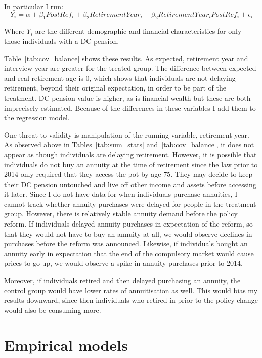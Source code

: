 \documentclass[12pt]{article}
\begin{document}
In particular I run:
\begin{equation*}
  Y_{i} = \alpha + \beta_{1} PostRef_{i} + \beta_{2} RetirementYear_{i}  + \beta_{2} RetirementYear_{i}PostRef_{i}  + \epsilon_{i}
\end{equation*}

Where $Y_{i}$ are the different demographic and financial characteristics for
only those individuals with a DC pension.

\linespread{1}

\linespread{1.5}

Table~\ref{tab:cov_balance} shows these results. As expected, retirement year
and interview year are greater for the treated group. The difference between
expected and real retirement age is 0, which shows that individuals are not
delaying retirement, beyond their original expectation, in order to be part of
the treatment. DC pension value is higher, as is financial wealth but these are
both imprecisely estimated. Because of the differences in these variables I add
them to the regression model.

One threat to validity is manipulation of the running variable, retirement year.
As observed above in Tables~\ref{tab:sum_stats} and~\ref{tab:cov_balance}, it
does not appear as though individuals are delaying retirement. However, it is
possible that individuals do not buy an annuity at the time of retirement since
the law prior to 2014 only required that they access the pot by age 75. They may
decide to keep their DC pension untouched and live off other income and assets
before accessing it later. Since I do not have data for when individuals
purchase annuities, I cannot track whether annuity purchases were delayed for
people in the treatment group. However, there is relatively stable annuity
demand before the policy
reform. If individuals delayed annuity purchases in expectation of the reform,
so that they would not have to buy an annuity at all, we would observe declines
in purchases before the reform was announced. Likewise, if individuals bought an
annuity early in expectation that the end of the compulsory market would cause
prices to go up, we would observe a spike in annuity purchases prior to 2014.

Moreover, if individuals retired and then delayed purchasing an annuity, the
control group would have lower rates of annuitisation as well. This would bias
my results downward, since then individuals who retired in prior to the policy
change would also be consuming more.


\section{Empirical models}
\end{document}
